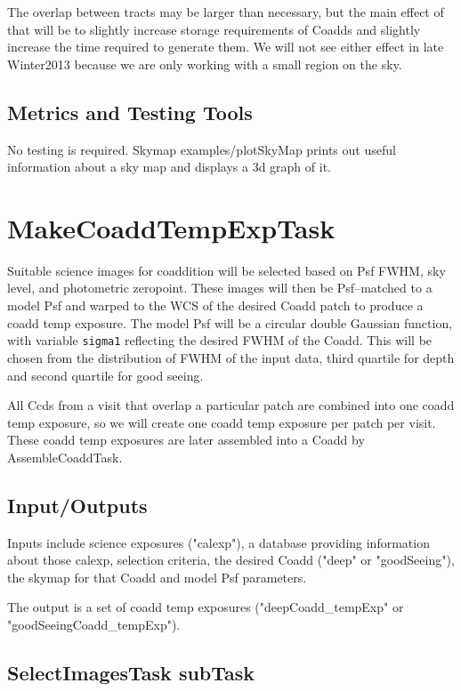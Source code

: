\documentclass[prd, nofootinbib, floatfix, 11pt,tightenlines,times]{article}
\begin{document}
The overlap between tracts may be larger than necessary, but the main effect of that
will be to slightly increase storage requirements of Coadds and slightly increase
the time required to generate them. We will not see either effect in late Winter2013
because we are only working with a small region on the sky.

\subsection{Metrics and Testing Tools}

No testing is required.  Skymap examples/plotSkyMap prints out useful
information about a sky map and displays a 3d graph of it.


\section{MakeCoaddTempExpTask} 

Suitable science images for coaddition will be selected based on Psf FWHM, 
sky level, and photometric zeropoint.  These images will then be Psf--matched to a model Psf and warped
to the WCS of the desired Coadd patch to produce a coadd temp exposure.
The model Psf will be a circular double Gaussian
function, with variable {\tt sigma1} reflecting the desired FWHM of the Coadd.  This will
be chosen from the distribution of FWHM of the input data, third quartile for depth and second
quartile for good seeing.

All Ccds from a visit that overlap a particular patch are combined into one coadd temp exposure,
so we will create one coadd temp exposure per patch per visit.
These coadd temp exposures are later assembled into a Coadd by AssembleCoaddTask.

\subsection{Input/Outputs}

Inputs include science exposures ("calexp"), a database providing information about
those calexp, selection criteria, the desired Coadd ("deep" or "goodSeeing"),
the skymap for that Coadd and model Psf parameters.

The output is a set of coadd temp exposures ("deepCoadd\_tempExp" or "goodSeeingCoadd\_tempExp").

\subsection{SelectImagesTask subTask} 
\end{document}
